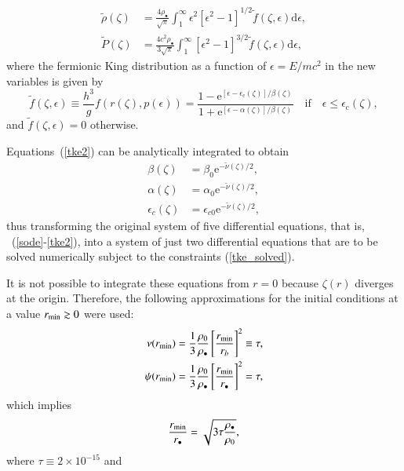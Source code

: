 \documentclass[referee]{aa} %
\begin{document}
\begin{appendix}
\begin{align}
    \tilde{\rho}(\zeta)&=\frac{4\rho_{\bullet}}{\sqrt{\pi}}\int^\infty_1\epsilon^2[\epsilon^2-1]^{1/2}\tilde{f}(\zeta,\epsilon)\mathrm{d}\epsilon,\\
   \tilde{P}(\zeta)&=\frac{4c^2\rho_{\bullet}}{3\sqrt{\pi}}\int^\infty_1[\epsilon^2-1]^{3/2}\tilde{f}(\zeta,\epsilon)\mathrm{d}\epsilon,
\end{align}
where the fermionic King distribution as a function of
$\epsilon=E/mc^2$ in the new variables is given by
\begin{equation}
\tilde{f}(\zeta,\epsilon)\equiv \frac{h^3}{g}f(r(\zeta),p(\epsilon))=
      \frac{1-\mathrm {e}^{[\epsilon-\epsilon_\mathrm{c}(\zeta)]/\beta(\zeta)}}
      {1+\mathrm {e}^{[\epsilon-\alpha(\zeta)]/\beta(\zeta)}}\quad\mathrm{if}\quad \epsilon \leq \epsilon_\mathrm{c}(\zeta),
\end{equation}
and $\tilde{f}(\zeta,\epsilon) = 0$ otherwise.

Equations~(\ref{tke2}) can be analytically integrated to obtain
\begin{align}
 \beta(\zeta) &= \beta_0\mathrm{e}^{-\tilde{\nu}(\zeta)/2}, \nonumber\\
 \alpha(\zeta) &= \alpha_0\mathrm{e}^{-\tilde{\nu}(\zeta)/2}, \nonumber\\
 \epsilon_c(\zeta) &= \epsilon_{c0}\mathrm{e}^{-\tilde{\nu}(\zeta)/2},
 \label{tke_solved}
\end{align}
thus transforming the original system of five differential equations, that is, ~(\ref{sode}-\ref{tke2}), into a system of just two differential equations that are to be solved numerically subject to the constraints (\ref{tke_solved}).

It is not possible to integrate these equations from $r=0$ because $\zeta(r)$ diverges at the origin.
Therefore, the following approximations for the initial conditions at a value $r_{\rm{min}}\gtrsim 0$ were used:
\begin{align}
   \nu(r_{\rm{min}}) &= \frac{1}{3}\frac{\rho_0}{\rho_\bullet}\left[\frac{r_{\rm{min}}}{r_b}\right]^2\equiv \tau, \\
   \psi(r_{\rm{min}})&= \frac{1}{3}\frac{\rho_0}{\rho_\bullet}\left[\frac{r_{\rm{min}}}{r_\bullet}\right]^2 = \tau,
\end{align}
which implies
\begin{equation}
   \frac{r_{\rm{min}}}{r_\bullet}=\sqrt{3\tau\frac{\rho_\bullet}{\rho_0}},
\end{equation}
where
$\tau\equiv 2\times10^{-15}$ and


\end{appendix}
\end{document}
